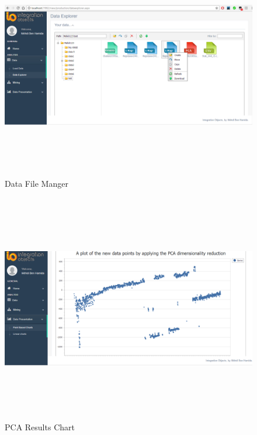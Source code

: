 ~\\
~\\
~\\
~\\



\begin{figure}[H]
\begin{center}
\includegraphics[width=17cm,height=10cm]{chapter5/dataexplorer.png}
\end{center}
\caption{Data File Manger}
\label{explorer}
\end{figure}

\begin{figure}[H]
\begin{center}
\includegraphics[width=17cm,height=10cm]{chapter5/pca.png}
\end{center}
\caption{PCA Results Chart}
\label{chartpca}
\end{figure}


